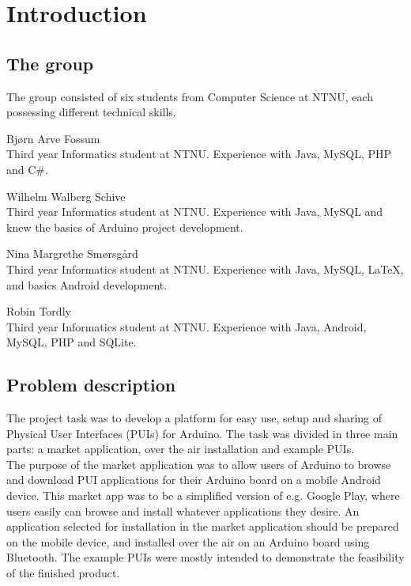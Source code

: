 \chapter{Introduction}
\section{The group}
The group consisted of six students from Computer Science at NTNU, each possessing different technical skills.

\begin{description}
\item{Bjørn Arve Fossum}\hfill \\
	Third year Informatics student at NTNU. Experience with Java, MySQL, PHP and C\#.
\item{Wilhelm Walberg Schive}\hfill \\
	Third year Informatics student at NTNU. Experience with Java, MySQL and knew the basics of Arduino project development.
\item{Nina Margrethe Smørsgård}\hfill \\
	Third year Informatics student at NTNU. Experience with Java, MySQL, \LaTeX, and basics Android development.
\item{Robin Tordly}\hfill \\
	Third year Informatics student at NTNU. Experience with Java, Android, MySQL, PHP and SQLite. 
\end{description}

\section{Problem description}
The project task was to develop a platform for easy use, setup and sharing of Physical User Interfaces (PUIs) for Arduino. The task was divided in three main parts: a market application, over the air installation and example PUIs.\\
\newline
The purpose of the market application was to allow users of Arduino to browse and download PUI applications for their Arduino board on a mobile Android device. This market app was to be a simplified version of e.g. Google Play, where users easily can browse and install whatever applications they desire. An application selected for installation in the market application should be prepared on the mobile device, and installed over the air on an Arduino board using Bluetooth. The example PUIs were mostly intended to demonstrate the feasibility of the finished product.

